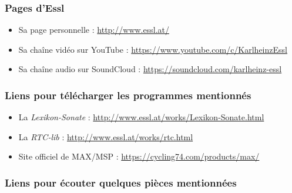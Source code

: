 \documentclass[a4paper,12pt]{article}
\begin{document}
\subsubsection*{Pages d'Essl}

\begin{itemize}
\item Sa page personnelle : \href{http://www.essl.at/}{http://www.essl.at/}
\item Sa chaîne vidéo sur YouTube : \href{https://www.youtube.com/c/KarlheinzEssl}{https://www.youtube.com/c/KarlheinzEssl}
\item Sa chaîne audio sur SoundCloud : \href{https://soundcloud.com/karlheinz-essl}{https://soundcloud.com/karlheinz-essl}
\end{itemize}

\subsubsection*{Liens pour télécharger les programmes mentionnés}

\begin{itemize}
\item La \emph{Lexikon-Sonate} : \href{http://www.essl.at/works/Lexikon-Sonate.html}{http://www.essl.at/works/Lexikon-Sonate.html}
\item La \emph{RTC-lib} : \href{http://www.essl.at/works/rtc.html}{http://www.essl.at/works/rtc.html}
\item Site officiel de MAX/MSP : \href{https://cycling74.com/products/max/}{https://cycling74.com/products/max/}
\end{itemize}

\subsubsection*{Liens pour écouter quelques pièces mentionnées}
\end{document}
